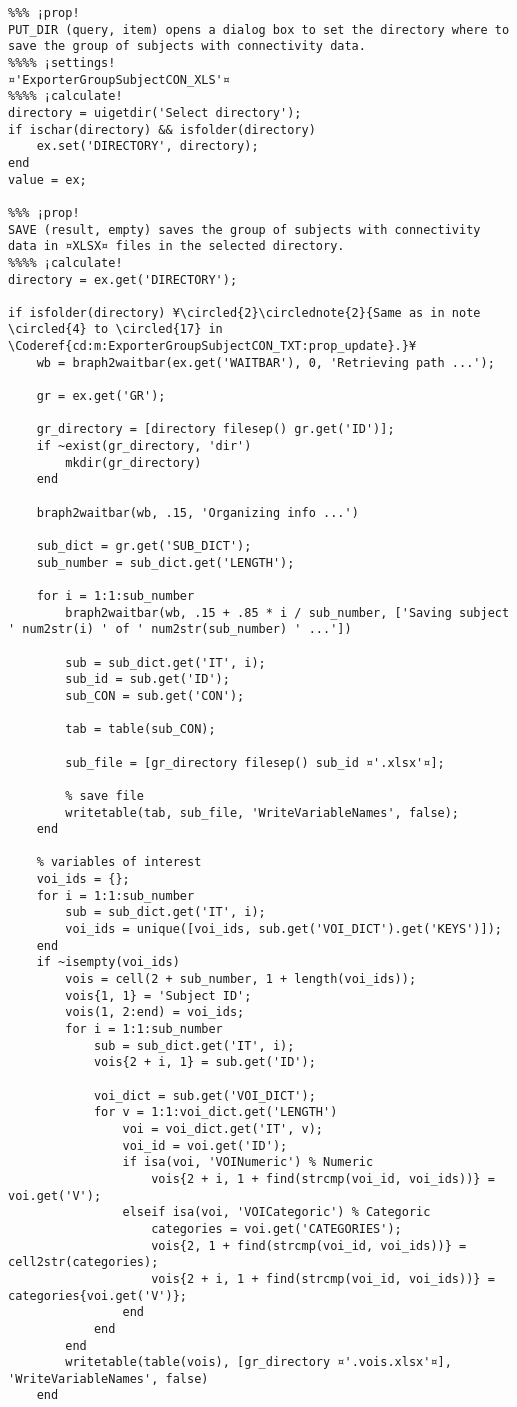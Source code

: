 \documentclass{tufte-handout}
\begin{document}
\begin{lstlisting}
%%% ¡prop!
PUT_DIR (query, item) opens a dialog box to set the directory where to save the group of subjects with connectivity data.
%%%% ¡settings!
¤'ExporterGroupSubjectCON_XLS'¤
%%%% ¡calculate!
directory = uigetdir('Select directory');
if ischar(directory) && isfolder(directory)
    ex.set('DIRECTORY', directory);
end
value = ex;

%%% ¡prop!
SAVE (result, empty) saves the group of subjects with connectivity data in ¤XLSX¤ files in the selected directory.
%%%% ¡calculate!
directory = ex.get('DIRECTORY');

if isfolder(directory) ¥\circled{2}\circlednote{2}{Same as in note \circled{4} to \circled{17} in \Coderef{cd:m:ExporterGroupSubjectCON_TXT:prop_update}.}¥
    wb = braph2waitbar(ex.get('WAITBAR'), 0, 'Retrieving path ...');
    
    gr = ex.get('GR');

    gr_directory = [directory filesep() gr.get('ID')];
    if ~exist(gr_directory, 'dir')
        mkdir(gr_directory)
    end
    
	braph2waitbar(wb, .15, 'Organizing info ...')
    
    sub_dict = gr.get('SUB_DICT');
    sub_number = sub_dict.get('LENGTH');

    for i = 1:1:sub_number
        braph2waitbar(wb, .15 + .85 * i / sub_number, ['Saving subject ' num2str(i) ' of ' num2str(sub_number) ' ...'])
        
        sub = sub_dict.get('IT', i);
        sub_id = sub.get('ID');
        sub_CON = sub.get('CON');
        
        tab = table(sub_CON);

        sub_file = [gr_directory filesep() sub_id ¤'.xlsx'¤];

        % save file
        writetable(tab, sub_file, 'WriteVariableNames', false);
    end
    
    % variables of interest
    voi_ids = {};
    for i = 1:1:sub_number
        sub = sub_dict.get('IT', i);
        voi_ids = unique([voi_ids, sub.get('VOI_DICT').get('KEYS')]);
    end
    if ~isempty(voi_ids)
        vois = cell(2 + sub_number, 1 + length(voi_ids));
        vois{1, 1} = 'Subject ID';
        vois(1, 2:end) = voi_ids;
        for i = 1:1:sub_number
            sub = sub_dict.get('IT', i);
            vois{2 + i, 1} = sub.get('ID');
            
            voi_dict = sub.get('VOI_DICT');
            for v = 1:1:voi_dict.get('LENGTH')
                voi = voi_dict.get('IT', v);
                voi_id = voi.get('ID');
                if isa(voi, 'VOINumeric') % Numeric
                    vois{2 + i, 1 + find(strcmp(voi_id, voi_ids))} = voi.get('V');
                elseif isa(voi, 'VOICategoric') % Categoric
                    categories = voi.get('CATEGORIES');
                    vois{2, 1 + find(strcmp(voi_id, voi_ids))} = cell2str(categories);
                    vois{2 + i, 1 + find(strcmp(voi_id, voi_ids))} = categories{voi.get('V')};
                end
            end
        end
        writetable(table(vois), [gr_directory ¤'.vois.xlsx'¤], 'WriteVariableNames', false)
    end


\end{lstlisting}
\end{document}
